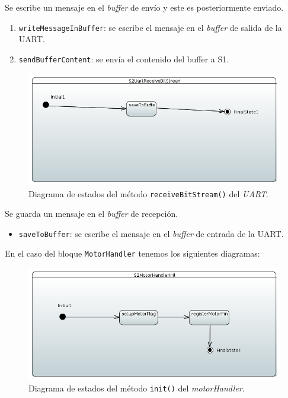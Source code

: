 Se escribe un mensaje en el \textit{buffer} de envío y este es posteriormente enviado.

\begin{enumerate}
    \item \texttt{writeMessageInBuffer}: se escribe el mensaje en el \textit{buffer} de salida de la \ac{UART}.
    \item \texttt{sendBufferContent}: se envía el contenido del buffer a \ac{S1}.
\end{enumerate}

\begin{figure}[H]
    \centering
    \includegraphics[width=1\linewidth]{pictures/S2UartReceiveBitStream.PNG}
    \caption{Diagrama de estados del método \texttt{receiveBitStream()} del \textit{UART}.}
    \label{fig:fun_receive_bit_stream_uart}
\end{figure}

Se guarda un mensaje en el \textit{buffer} de recepción.

\begin{itemize}
    \item \texttt{saveToBuffer}: se escribe el mensaje en el \textit{buffer} de entrada de la \ac{UART}.
\end{itemize}


En el caso del bloque \texttt{MotorHandler} tenemos los siguientes diagramas:

\begin{figure}[H]
    \centering
    \includegraphics[width=1\linewidth]{pictures/S2MotorHandlerInit.PNG}
    \caption{Diagrama de estados del método \texttt{init()} del \textit{motorHandler}.}
    \label{fig:fun_init_motor_handler}
\end{figure}

